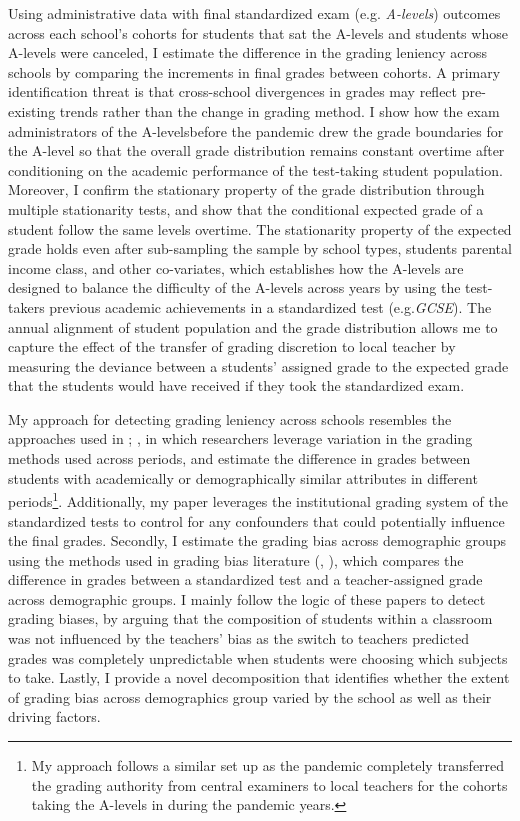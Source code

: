 Using administrative data with final standardized exam  (e.g. \emph{A-levels})  outcomes across each school's cohorts for students that sat the A-levels and students whose A-levels were canceled, I estimate the difference in the grading leniency across schools by comparing the increments in final grades between cohorts. A primary identification threat is that cross-school divergences in grades may reflect pre-existing trends rather than the change in grading method. I show how the exam administrators of the A-levelsbefore the pandemic drew the grade boundaries for the A-level so that the overall grade distribution remains constant overtime after conditioning on the academic performance of the test-taking student population. Moreover, I confirm the stationary property of the grade distribution through multiple stationarity tests, and show that the conditional expected grade of a student follow the same levels overtime. The stationarity property of the expected grade holds even after sub-sampling the sample by school types, students parental income class, and other co-variates, which establishes how the A-levels are designed to balance the difficulty of the A-levels across years by using the test-takers previous academic achievements in a standardized test (e.g.\emph{GCSE}). The annual alignment of student population and the grade distribution allows me to capture the effect of the transfer of grading discretion to local teacher by measuring the deviance between a students' assigned grade to the expected grade that the students would have received if they took the standardized exam. 

My approach for detecting grading leniency across schools resembles the approaches used in \cite{neal2008}; \cite{dee2019}, in which researchers leverage variation in the grading methods used across periods, and estimate the difference in grades between students with academically or demographically similar attributes in different periods\footnote{My approach follows a similar set up as the pandemic completely transferred the grading authority from central examiners to local teachers for the cohorts taking the A-levels in during the pandemic years. }. Additionally, my paper leverages the institutional grading system of the standardized tests to control for any confounders that could potentially influence the final grades. Secondly, I estimate the grading bias across demographic groups using the methods used in grading bias literature (\cite{lavy2018}, \cite{10.1093/qje/qjz008}), which compares the difference in grades between a standardized test and a teacher-assigned grade across demographic groups. I mainly follow the logic of these papers to detect grading biases, by arguing that the composition of students within a classroom was not influenced by the teachers' bias as the switch to teachers predicted grades was completely unpredictable when students were choosing which subjects to take. Lastly, I provide a novel decomposition that identifies whether the extent of grading bias across demographics group varied by the school as well as their driving factors. 

